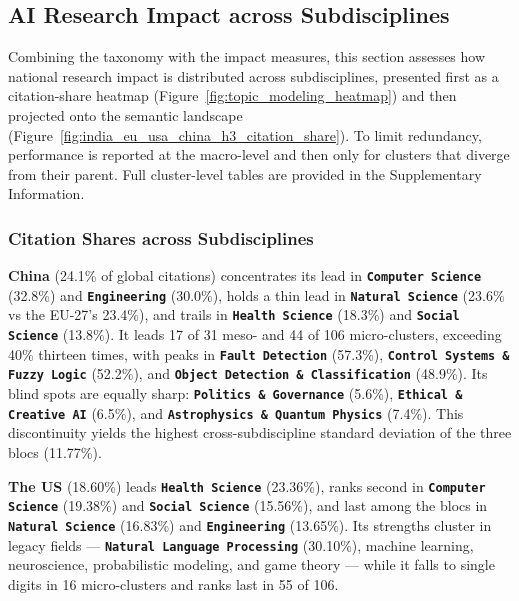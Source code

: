 \documentclass{article}
\begin{document}
	\subsection{AI Research Impact across Subdisciplines}
	\label{impact_across_subdisciplines}
	
	Combining the taxonomy with the impact measures, this section assesses how national research impact is distributed across subdisciplines, presented first as a citation-share heatmap (Figure~\ref{fig:topic_modeling_heatmap}) and then projected onto the semantic landscape (Figure~\ref{fig:india_eu_usa_china_h3_citation_share}). To limit redundancy, performance is reported at the macro-level and then only for clusters that diverge from their parent. Full cluster-level tables are provided in the Supplementary Information.
	
	\subsubsection{Citation Shares across Subdisciplines}
	
	\textbf{China} (24.1\% of global citations) concentrates its lead in \textbf{\texttt{Computer Science}}  (32.8\%) and \textbf{\texttt{Engineering}}  (30.0\%), holds a thin lead in \textbf{\texttt{Natural Science}}  (23.6\% vs the EU-27's 23.4\%), and trails in \textbf{\texttt{Health Science}}  (18.3\%) and \textbf{\texttt{Social Science}}  (13.8\%). It leads 17 of 31 meso- and 44 of 106 micro-clusters, exceeding 40\% thirteen times, with peaks in \textbf{\texttt{Fault Detection}}  (57.3\%), \textbf{\texttt{Control Systems \& Fuzzy Logic}}  (52.2\%), and \textbf{\texttt{Object Detection \& Classification}}  (48.9\%). Its blind spots are equally sharp: \textbf{\texttt{Politics \& Governance}}  (5.6\%), \textbf{\texttt{Ethical \& Creative AI}}  (6.5\%), and \textbf{\texttt{Astrophysics \& Quantum Physics}}  (7.4\%). This discontinuity yields the highest cross-subdiscipline standard deviation of the three blocs (11.77\%).
	
	\textbf{The US} (18.60\%) leads \textbf{\texttt{Health Science}}  (23.36\%), ranks second in \textbf{\texttt{Computer Science}}  (19.38\%) and \textbf{\texttt{Social Science}}  (15.56\%), and last among the blocs in \textbf{\texttt{Natural Science}}  (16.83\%) and \textbf{\texttt{Engineering}}  (13.65\%). Its strengths cluster in legacy fields --- \textbf{\texttt{Natural Language Processing}}  (30.10\%), machine learning, neuroscience, probabilistic modeling, and game theory --- while it falls to single digits in 16 micro-clusters and ranks last in 55 of 106.
	
\end{document}
